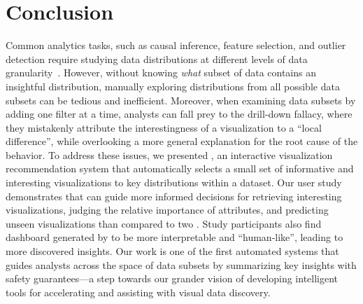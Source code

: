\section{Conclusion}
\par Common analytics tasks, such as causal inference, feature selection, and outlier detection require studying data distributions at different levels of data granularity~\cite{Anand2015,Heer2012,Wu2013,Hullman2017}. However, without knowing \textit{what} subset of data contains an insightful distribution, manually exploring distributions from all possible data subsets can be tedious and inefficient. Moreover, when examining data subsets by adding one filter at a time, analysts can fall prey to the drill-down fallacy, where they mistakenly attribute the interestingness of a visualization to a ``local difference'', while overlooking a more general explanation for the root cause of the behavior. To address these issues, we presented \system, an interactive visualization recommendation system that automatically selects a small set of informative and interesting visualizations to  key distributions within a dataset. Our user study demonstrates that \system can guide  more informed decisions for retrieving interesting visualizations, judging the relative importance of attributes, and predicting unseen visualizations than compared to two . Study participants also find dashboard generated by \system to be more interpretable and ``human-like'', leading to more discovered insights. Our work is one of the first automated systems that guides analysts across the space of data subsets by summarizing key insights with safety guarantees---a step towards our grander vision of developing intelligent tools for accelerating and assisting with visual data discovery.  
